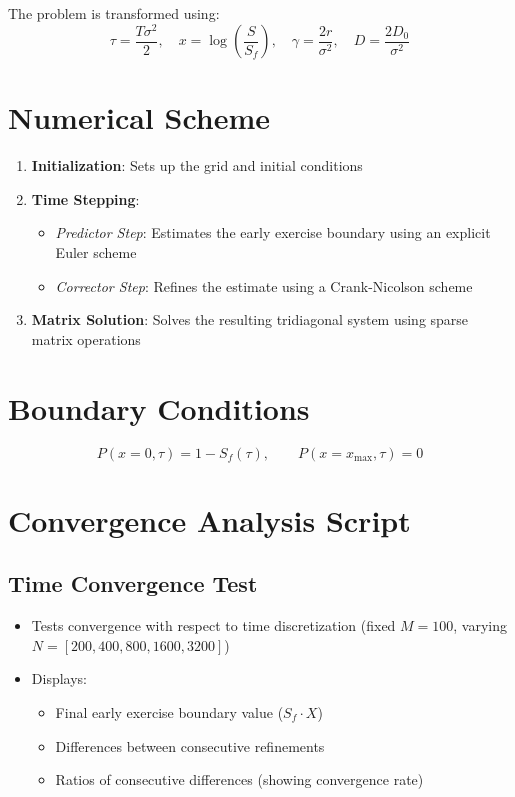\documentclass[12pt]{article}
\begin{document}
The problem is transformed using:
\[
\tau = \frac{T \sigma^2}{2}, \quad x = \log\left(\frac{S}{S_f}\right), \quad \gamma = \frac{2r}{\sigma^2}, \quad D = \frac{2D_0}{\sigma^2}
\]

\section*{Numerical Scheme}
\begin{enumerate}
  \item \textbf{Initialization}: Sets up the grid and initial conditions
  \item \textbf{Time Stepping}:
    \begin{itemize}
      \item \textit{Predictor Step}: Estimates the early exercise boundary using an explicit Euler scheme
      \item \textit{Corrector Step}: Refines the estimate using a Crank-Nicolson scheme
    \end{itemize}
  \item \textbf{Matrix Solution}: Solves the resulting tridiagonal system using sparse matrix operations
\end{enumerate}

\section*{Boundary Conditions}
\[
P(x=0, \tau) = 1 - S_f(\tau), \qquad P(x = x_{\max}, \tau) = 0
\]

\section*{Convergence Analysis Script}

\subsection*{Time Convergence Test}
\begin{itemize}
  \item Tests convergence with respect to time discretization (fixed $M=100$, varying $N = [200, 400, 800, 1600, 3200]$)
  \item Displays:
  \begin{itemize}
    \item Final early exercise boundary value ($S_f \cdot X$)
    \item Differences between consecutive refinements
    \item Ratios of consecutive differences (showing convergence rate)
  \end{itemize}
\end{itemize}
\end{document}
